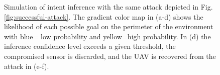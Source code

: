 \documentclass[letterpaper, 10 pt, conference]{ieeeconf}  %
\begin{document}
\begin{figure}[]
	\centering
	\vspace{-5pt}
	\caption{Simulation of intent inference with the same attack depicted in Fig.\ref{fig:successful-attack}. The gradient color map in (a-d) shows the likelihood of each possible goal on the perimeter of the environment with blue= low probability and yellow=high probability. In (d) the inference confidence level exceeds a given threshold, the compromised sensor is discarded, and the UAV is recovered from the attack in (e-f).}
	\label{fig:recovered-attack}
\end{figure}
\end{document}
